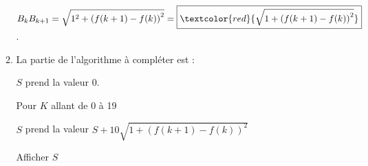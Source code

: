 \documentclass[12pt]{article}
\begin{document}
\begin{enumerate}
\begin{enumerate}
$B_kB_{k+1}=\sqrt{1^2+\left(f(k+1)-f(k)\right)^2}=\boxed{\textcolor{red}{\sqrt{1+\left(f(k+1)-f(k)\right)^2}}}$.

\item%
%		
La partie de l'algorithme à compléter est :

\noindent $S$ prend la valeur 0.

\noindent Pour $K$ allant de 0 à 19

$S$ prend la valeur $S+10\sqrt{1+\left(f(k+1)-f(k)\right)^2}$

Afficher $S$
	\end{enumerate}
\end{enumerate}
\end{document}
